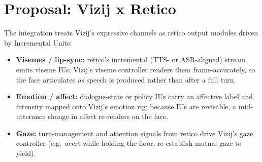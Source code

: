 \documentclass[conference]{IEEEtran}
\begin{document}
%


\section{Proposal: Vizij x Retico}

The integration treats Vizij's expressive channels as retico output modules
driven by Incremental Units:
\begin{itemize}
  \item \textbf{Visemes / lip-sync:} retico's incremental (TTS- or
        ASR-aligned) stream emits viseme IUs; Vizij's viseme controller
        renders them frame-accurately, so the face articulates \emph{as}
        speech is produced rather than after a full turn.
  \item \textbf{Emotion / affect:} dialogue-state or policy IUs carry an
        affective label and intensity mapped onto Vizij's emotion rig;
        because IUs are revisable, a mid-utterance change in affect
        re-renders on the face.
  \item \textbf{Gaze:} turn-management and attention signals from retico
        drive Vizij's gaze controller (e.g.\ avert while holding the floor,
        re-establish mutual gaze to yield).
\end{itemize}
\end{document}
